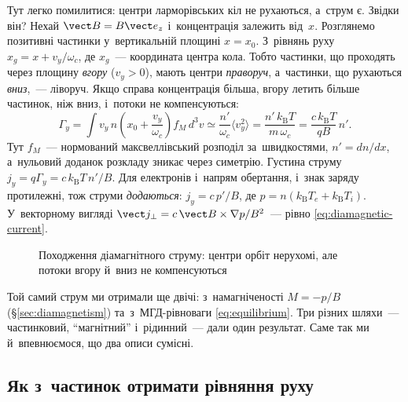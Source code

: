 Тут легко помилитися: центри ларморівських кіл не рухаються, а~струм є. Звідки він? Нехай
$\vect B=B\vect e_z$ і~концентрація залежить від~$x$. Розглянемо позитивні частинки
у~вертикальній площині $x=x_0$. З~рівнянь руху $x_g=x+v_y/\omega_c$, де $x_g$~---
координата центра кола. Тобто частинки, що проходять через площину \emph{вгору} ($v_y>0$),
мають центри \emph{праворуч}, а~частинки, що рухаються \emph{вниз},~--- ліворуч. Якщо
справа концентрація більша, вгору летить більше частинок, ніж вниз, і~потоки не
компенсуються:
\begin{equation*}
	\Gamma_y=\int v_y\,n\!\left(x_0+\frac{v_y}{\omega_c}\right)f_M\,d^3v
	\simeq\frac{n'}{\omega_c}\langle v_y^2\rangle
	=\frac{n'\,k_{\mathrm B}T}{m\,\omega_c}
	=\frac{c\,k_{\mathrm B}T}{qB}\,n'.
\end{equation*}
Тут $f_M$~--- нормований максвеллівський розподіл за~швидкостями, $n'=dn/dx$, а~нульовий
доданок розкладу зникає через симетрію. Густина струму $j_y=q\Gamma_y=c\,k_{\mathrm
B}T\,n'/B$. Для електронів і~напрям обертання, і~знак заряду протилежні, тож струми
\emph{додаються}: $j_y=c\,p'/B$, де $p=n(k_{\mathrm B}T_e+k_{\mathrm B}T_i)$. У~векторному
вигляді $\vect j_\perp=c\,\vect B\times\nabla p/B^2$~--- рівно
\eqref{eq:diamagnetic-current}.

\begin{figure}[h!]\centering
	\caption{Походження діамагнітного струму: центри орбіт нерухомі, але потоки вгору
	й~вниз не компенсуються}
	\label{pic:new-diamagnetic-flux}
\end{figure}

Той самий струм ми отримали ще двічі: з~намагніченості $M=-p/B$ (§\ref{sec:diamagnetism})
та~з~МГД-рівноваги \eqref{eq:equilibrium}. Три різних шляхи~--- частинковий,
\enquote{магнітний} і~рідинний~--- дали один результат. Саме так ми й~впевнюємося, що два
описи сумісні.



\subsection{Як з~частинок отримати рівняння руху}




